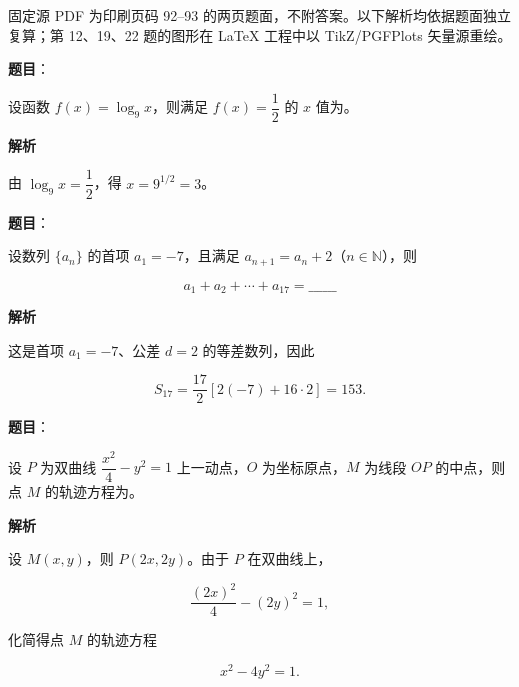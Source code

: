 

\begin{gktip}
固定源 PDF 为印刷页码 92–93 的两页题面，不附答案。以下解析均依据题面独立复算；第 12、19、22 题的图形在 LaTeX 工程中以 TikZ/PGFPlots 矢量源重绘。
\end{gktip}


\begin{answer}

\textbf{题目}：

设函数 $f(x)=\log_9x$，则满足 $f(x)=\dfrac12$ 的 $x$ 值为\gkblank{}。

\textbf{解析}

由 $\log_9x=\dfrac12$，得 $x=9^{1/2}=3$。


\end{answer}
\begin{answer}

\textbf{题目}：

设数列 $\{a_n\}$ 的首项 $a_1=-7$，且满足 $a_{n+1}=a_n+2$（$n\in\mathbb N$），则

\nopagebreak[4]
\[
a_1+a_2+\cdots+a_{17}=\_\_\_\_\_\_
\]

\textbf{解析}

这是首项 $a_1=-7$、公差 $d=2$ 的等差数列，因此

\nopagebreak[4]
\[
S_{17}=\frac{17}{2}\left[2(-7)+16\cdot2\right]=153.
\]


\end{answer}
\begin{answer}

\textbf{题目}：

设 $P$ 为双曲线 $\dfrac{x^2}{4}-y^2=1$ 上一动点，$O$ 为坐标原点，$M$ 为线段 $OP$ 的中点，则点 $M$ 的轨迹方程为\gkblank{}。

\textbf{解析}

设 $M(x,y)$，则 $P(2x,2y)$。由于 $P$ 在双曲线上，

\nopagebreak[4]
\[
\frac{(2x)^2}{4}-(2y)^2=1,
\]

化简得点 $M$ 的轨迹方程

\nopagebreak[4]
\[
x^2-4y^2=1.
\]


\end{answer}
